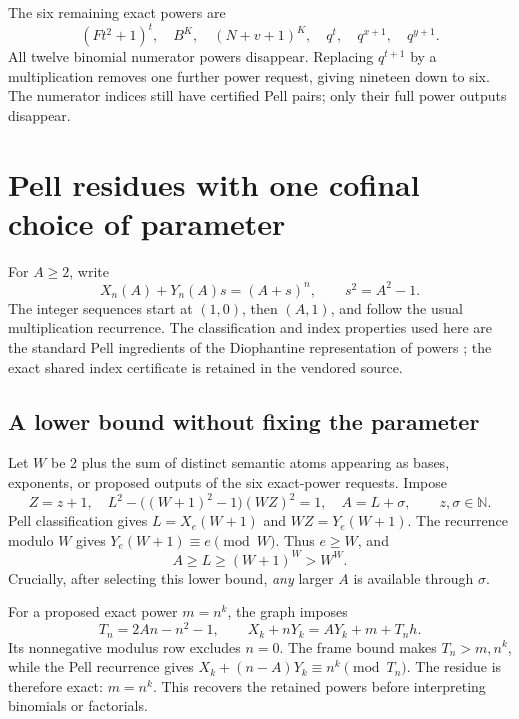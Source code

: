 \documentclass[11pt,letterpaper]{article}
\theoremstyle{remark}\newtheorem{remark}[theorem]{Remark}
\newcommand{\N}{\mathbb N}\newcommand{\Z}{\mathbb Z}
\begin{document}
The six remaining exact powers are
\[
 (Ft^2+1)^t,\quad B^K,\quad (N+v+1)^K,\quad
 q^t,\quad q^{x+1},\quad q^{y+1}.
\]
All twelve binomial numerator powers disappear. Replacing
\(q^{t+1}\) by a multiplication removes one further power request,
giving nineteen down to six. The numerator indices still have certified
Pell pairs; only their full power outputs disappear.

\section{Pell residues with one cofinal choice of parameter}

For \(A\ge2\), write
\[
 X_n(A)+Y_n(A)s=(A+s)^n,
       \qquad s^2=A^2-1.
\]
The integer sequences start at \((1,0)\), then \((A,1)\), and follow
the usual multiplication recurrence. The classification and index
properties used here are the standard Pell ingredients of the
Diophantine representation of powers \cite{pell}; the exact shared
index certificate is retained in the vendored source.

\subsection{A lower bound without fixing the parameter}

Let \(W\) be 2 plus the sum of distinct semantic atoms appearing as
bases, exponents, or proposed outputs of the six exact-power requests.
Impose
\begin{equation}
 Z=z+1,\quad
 L^2-\bigl((W+1)^2-1\bigr)(WZ)^2=1,\quad
 A=L+\sigma,\qquad z,\sigma\in\N. \label{eq:cofinal}
\end{equation}
Pell classification gives \(L=X_e(W+1)\) and \(WZ=Y_e(W+1)\).
The recurrence modulo \(W\) gives \(Y_e(W+1)\equiv e\pmod W\).
Thus \(e\ge W\), and
\begin{equation}
 A\ge L\ge(W+1)^W>W^W. \label{eq:framegrowth}
\end{equation}
Crucially, after selecting this lower bound, \emph{any} larger \(A\)
is available through \(\sigma\).

For a proposed exact power \(m=n^k\), the graph imposes
\[
 T_n=2An-n^2-1,\qquad
 X_k+nY_k=AY_k+m+T_n h.
\]
Its nonnegative modulus row excludes \(n=0\). The frame bound makes
\(T_n>m,n^k\), while the Pell recurrence gives
\(X_k+(n-A)Y_k\equiv n^k\pmod{T_n}\). The residue is therefore exact:
\(m=n^k\). This recovers the retained powers before interpreting
binomials or factorials.
\end{document}
